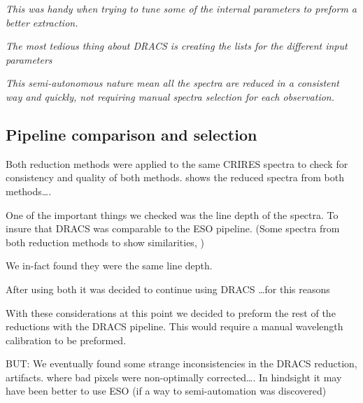 \textit{This was handy when trying to tune some of the internal parameters to preform a better extraction.}


\textit{The most tedious thing about DRACS is creating the lists for the different input parameters}

\textit{This semi-autonomous nature mean all the spectra are reduced in a consistent way and quickly, not requiring manual spectra selection for each observation.}


\subsection{Pipeline comparison and selection}

Both reduction methods were applied to the same CRIRES spectra to check for consistency and quality of both methods.  shows the reduced spectra from both methods\ldots.

One of the important things we checked was the line depth of the spectra. To insure that DRACS was comparable to the ESO pipeline.
\missingfigure(Some spectra from both reduction methods to show similarities, )
\begin{figure}
   \label{fig:reductioncomparsion}
\end{figure}

We in-fact found they were the same line depth.


After using both it was decided to continue using DRACS \ldots for this reasons

With these considerations at this point we decided to preform the rest of the reductions with the DRACS pipeline. This would require a manual wavelength calibration to be preformed. 


BUT: We eventually found some strange inconsistencies in the DRACS reduction, artifacts. where bad pixels were non-optimally corrected\ldots.
In hindsight it may have been better to use ESO (if a way to semi-automation was discovered)



